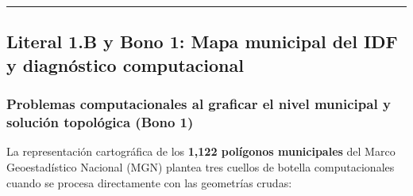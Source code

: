 \documentclass[
  10pt,
  letterpaper,
  DIV=11,
  numbers=noendperiod]{scrartcl}
\begin{document}
\begin{center}\rule{0.5\linewidth}{0.5pt}\end{center}

\subsection{Literal 1.B y Bono 1: Mapa municipal del IDF y diagnóstico
computacional}\label{literal-1.b-y-bono-1-mapa-municipal-del-idf-y-diagnuxf3stico-computacional}

\subsubsection{Problemas computacionales al graficar el nivel municipal
y solución topológica (Bono
1)}\label{problemas-computacionales-al-graficar-el-nivel-municipal-y-soluciuxf3n-topoluxf3gica-bono-1}

La representación cartográfica de los \textbf{1,122 polígonos
municipales} del Marco Geoestadístico Nacional (MGN) plantea tres
cuellos de botella computacionales cuando se procesa directamente con
las geometrías crudas:
\end{document}
